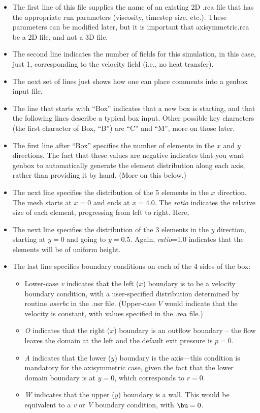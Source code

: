 \begin{itemize}
\item
The first line of this file supplies the name of an existing 2D .rea file
that has the appropriate run parameters (viscosity, timestep size, etc.).
These parameters can be modified later, but it is important that 
axisymmetric.rea be a 2D file, and not a 3D file.
\item
The second line indicates the number of fields for this simulation, in
this case, just 1, corresponding to the velocity field (i.e., no heat 
transfer).
\item
The next set of lines just shows how one can place comments into a genbox
input file.
\item
The line that starts with ``Box'' indicates that a new box is starting,
and that the following lines describe a typical box input.  Other possible
key characters (the first character of Box, ``B'') are ``C'' and ``M'',
more on those later.
\item
The first line after ``Box'' specifies the number of elements in the
\(x\) and \(y\) directions.   The fact that these values are negative indicates
that you want genbox to automatically generate the element distribution 
along each axis, rather than providing it by hand.  (More on this below.)
\item
The next line specifies the distribution of the 5 elements in the \(x\) direction.
The mesh starts at \(x=0\) and ends at \(x=4.0\).  The {\em ratio} indicates the
relative size of each element, progressing from left to right.  Here, 
\item
The next line specifies the distribution of the 3 elements in the \(y\) direction,
starting at \(y=0\) and going to \(y=0.5\).  Again, 
{\em ratio}=1.0 indicates that the elements will be of uniform height.
\item
The last line specifies boundary conditions on each of the 4 sides of the
box:  
\begin{itemize}
\item
Lower-case {\em v} indicates that the left (\(x\)) boundary is to be a velocity
boundary condition, with a user-specified distribution determined by 
routine {\em userbc} in the .usr file.  (Upper-case \(V\) would indicate that
the velocity is constant, with values specified in the .rea file.)
\item
{\em O} indicates that the right (\(x\)) boundary is an outflow boundary -- the
flow leaves the domain at the left and the default exit pressure is \(p=0\).
\item
{\em A} indicates that the lower (\(y\)) boundary is the axis---this condition
is mandatory for the axisymmetric case, given the fact that the lower domain
boundary is at \(y=0\), which corresponds to \(r=0\).
\item
{\em W} indicates that the upper (\(y\)) boundary is a wall.  This would be
equivalent to a {\em v} or {\em V} boundary condition, with \(\bu=0\).
\end{itemize}
\end{itemize}


